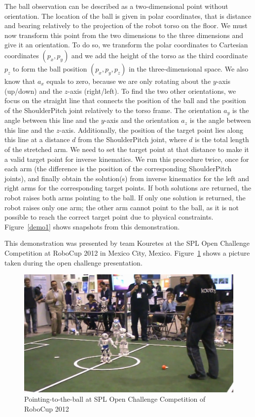 The ball observation can be described as a two-dimensional point without orientation. The location of the ball is given in polar coordinates, that is distance and bearing relatively to the projection of the robot torso on the floor. We must now transform this point from the two dimensions to the three dimensions and give it an orientation. To do so, we transform the polar coordinates to Cartesian coordinates $(p_x,p_y)$ and we add the height of the torso as the third coordinate $p_z$ to form the ball position $(p_x,p_y,p_z)$ in the three-dimensional space.  We also know that $a_x$ equals to zero, because we are only rotating about the $y$-axis (up/down) and the $z$-axis (right/left). To find the two other orientations, we focus on the straight line that connects the position of the ball and the position of the ShoulderPitch joint relatively to the torso frame. The orientation $a_y$ is the angle between this line and the $y$-axis and the orientation $a_z$ is the angle between this line and the $z$-axis. Additionally, the position of the target point lies along this line at a distance $d$ from the ShoulderPitch joint, where $d$ is the total length of the stretched arm. We need to set the target point at that distance to make it a valid target point for inverse kinematics. We run this procedure twice, once for each arm (the difference is the position of the corresponding ShoulderPitch joints), and finally obtain the solution(s) from inverse kinematics for the left and right arms for the corresponding target points. If both solutions are returned, the robot raises both arms pointing to the ball. If only one solution is returned, the robot raises only one arm; the other arm cannot point to the ball, as it is not possible to reach the correct target point due to physical constraints. Figure~\ref{demo1} shows snapshots from this demonstration.

This demonstration was presented by team Kouretes at the SPL Open Challenge Competition at RoboCup 2012 in Mexico City, Mexico. Figure~\ref{fig:open} shows a picture taken during the open challenge presentation. 

\begin{figure}[!t]
\centerline{
\includegraphics[width=.8\textwidth]{Figures/openchallenge2012.png}
}
\caption{Pointing-to-the-ball at SPL Open Challenge Competition of RoboCup 2012}
\label{fig:open}
\end{figure}



